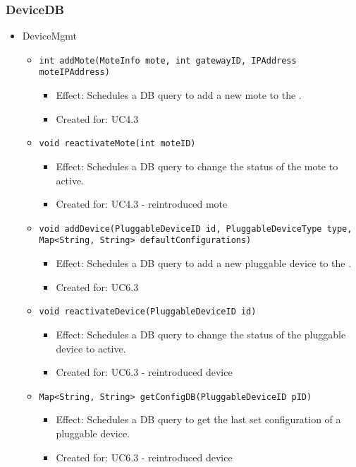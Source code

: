 {{{    \subsubsection{DeviceDB}
        \begin{itemize}
            \item DeviceMgmt
                \begin{itemize}
                    \item \texttt{int addMote(MoteInfo mote, int gatewayID, IPAddress moteIPAddress)}
                        \begin{itemize}
                            \item Effect: Schedules a DB query to add a new mote to the .
                            \item Created for: UC4.3
                        \end{itemize}
                    \item \texttt{void reactivateMote(int moteID)}
                        \begin{itemize}
                            \item Effect: Schedules a DB query to change the status of the mote to active.
                            \item Created for: UC4.3 - reintroduced mote
                        \end{itemize}
                    \item \texttt{void addDevice(PluggableDeviceID id, PluggableDeviceType type, Map<String, String> defaultConfigurations)}
                        \begin{itemize}
                            \item Effect: Schedules a DB query to add a new pluggable device to the .
                            \item Created for: UC6.3
                        \end{itemize}
                    \item \texttt{void reactivateDevice(PluggableDeviceID id)}
                        \begin{itemize}
                            \item Effect: Schedules a DB query to change the status of the pluggable device to active.
                            \item Created for: UC6.3 - reintroduced device
                        \end{itemize}
                    \item \texttt{Map<String, String> getConfigDB(PluggableDeviceID pID)}
                        \begin{itemize}
                            \item Effect: Schedules a DB query to get the last set configuration of a pluggable device.
                            \item Created for: UC6.3 - reintroduced device
                        \end{itemize}
                    \end{itemize}
                \end{itemize}

}}}
